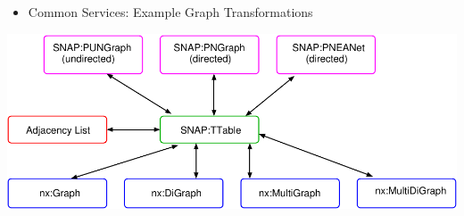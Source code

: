 \documentclass[landscape,paperwidth=70in,paperheight=46in,fontscale=0.225]{baposter} %
\begin{document}
\begin{poster}
{%
\begin{itemize}[leftmargin=*,noitemsep,topsep=0pt]
\item Common Services:  Example Graph Transformations
\end{itemize} 
\begin{center}
\includegraphics[scale=0.5]{figures/star_trans.pdf}
\end{center}

}
\end{poster}
\end{document}
